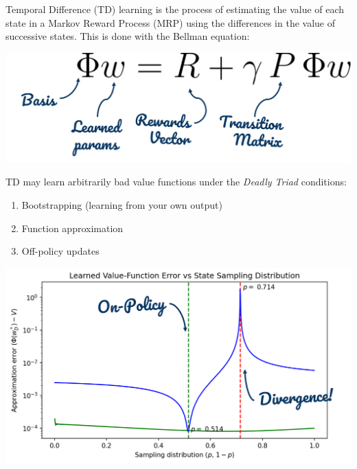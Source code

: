 
Temporal Difference (TD) learning is the process of estimating the value of each state in a Markov Reward Process (MRP) using the differences in the value of successive states. This is done with the Bellman equation:
\begin{center}
    \includegraphics[scale=0.4]{parts/intro/bellman}
\end{center}\vspace{-.1in}
TD may learn arbitrarily bad value functions under the \emph{Deadly Triad} conditions:
\begin{enumerate}
    \item Bootstrapping (learning from your own output)
    \item Function approximation
    \item Off-policy updates
\end{enumerate}\vspace{-.15in}
\begin{center}
    \includegraphics[scale=0.4]{parts/intro/threestatedivergence}
\end{center}\vspace{-.1in}
